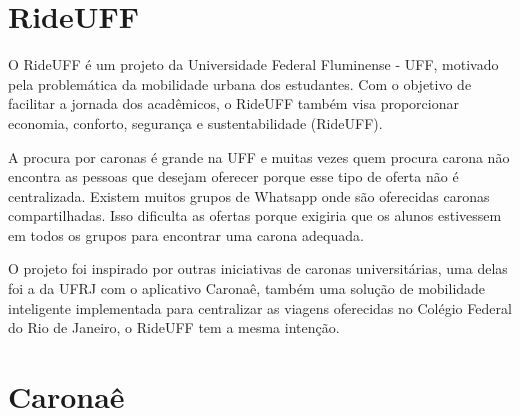 \section{RideUFF}

O RideUFF é um projeto da Universidade Federal Fluminense - UFF, motivado pela problemática da mobilidade urbana dos estudantes. Com o objetivo de facilitar a jornada dos acadêmicos, o RideUFF também visa proporcionar economia, conforto, segurança e sustentabilidade (RideUFF).

A procura por caronas é grande na UFF e muitas vezes quem procura carona não encontra as pessoas que desejam oferecer porque esse tipo de oferta não é centralizada. Existem muitos grupos de Whatsapp onde são oferecidas caronas compartilhadas. Isso dificulta as ofertas porque exigiria que os alunos estivessem em todos os grupos para encontrar uma carona adequada.

O projeto foi inspirado por outras iniciativas de caronas universitárias, uma delas foi a da UFRJ com o aplicativo Caronaê, também uma solução de mobilidade inteligente implementada para centralizar as viagens oferecidas no Colégio Federal do Rio de Janeiro, o RideUFF tem a mesma intenção.



\section{Caronaê}

